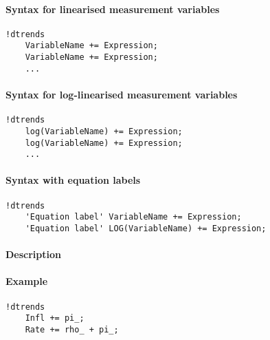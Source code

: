


	\paragraph{Syntax for linearised measurement
variables}

\begin{verbatim}
!dtrends
    VariableName += Expression;
    VariableName += Expression;
    ...
\end{verbatim}

\paragraph{Syntax for log-linearised measurement
variables}

\begin{verbatim}
!dtrends
    log(VariableName) += Expression;
    log(VariableName) += Expression;
    ...
\end{verbatim}

\paragraph{Syntax with equation
labels}

\begin{verbatim}
!dtrends
    'Equation label' VariableName += Expression;
    'Equation label' LOG(VariableName) += Expression;
\end{verbatim}

\paragraph{Description}

\paragraph{Example}

\begin{verbatim}
!dtrends
    Infl += pi_;
    Rate += rho_ + pi_;
\end{verbatim}


